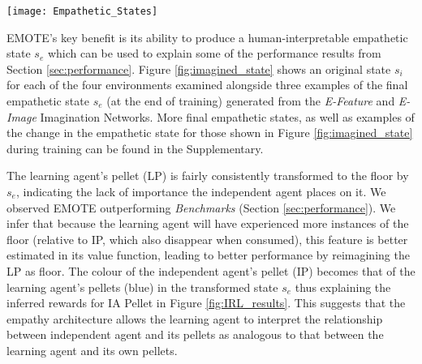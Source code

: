 \begin{figure*}[ht]
\vskip -0.2in
\begin{center}
\centerline{\texttt{[image: Empathetic\_States]}}
\caption{Empathetic states $s_{e}$ produced by E-Feature (Col 2 - 4) and E-Image (Col 5 - 7) for original state $s_{i}$ (Col 1). Details on construction of $s_{e}$ plots are provided in the Supplementary.}
\label{fig:imagined_state}
\end{center}
\vskip -0.4in
\end{figure*}

EMOTE's key benefit is its ability to produce a human-interpretable empathetic state $s_{e}$ which can be used to explain some of the performance results from Section \ref{sec:performance}. Figure \ref{fig:imagined_state} shows an original state $s_{i}$ for each of the four environments examined alongside three examples of the final empathetic state $s_{e}$ (at the end of training) generated from the \emph{E-Feature} and \emph{E-Image} Imagination Networks.
More final empathetic states, as well as examples of the change in the empathetic state for those shown in Figure \ref{fig:imagined_state} during training can be found in the Supplementary.

The learning agent's pellet (LP) is fairly consistently transformed to the floor by $s_{e}$, indicating the lack of importance the independent agent places on it.  We observed EMOTE outperforming \emph{Benchmarks} (Section \ref{sec:performance}). We infer that because the learning agent will have experienced more instances of the floor (relative to IP, which also disappear when consumed), this feature is better estimated in its value function, leading to better performance by reimagining the LP as floor. 
The colour of the independent agent's pellet (IP) becomes that of the learning agent's pellets (blue) in the transformed state $s_e$ thus explaining the inferred rewards for IA Pellet in Figure \ref{fig:IRL_results}. This suggests that the empathy architecture allows the learning agent to interpret the relationship between independent agent and its pellets as analogous to that between the learning agent and its own pellets.%

